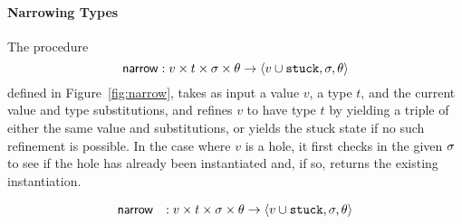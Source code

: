 \paragraph{Narrowing Types}
The procedure %
\[
\mathsf{narrow} : v \times t \times \sigma \times \theta \rightarrow \langle v \cup \mathtt{stuck}, \sigma, \theta \rangle
\]%
defined in Figure~\ref{fig:narrow}, takes as input a value $v$, a type
$t$, and the current value and type substitutions, and refines $v$ to
have type $t$ by yielding a triple of either the same value and
substitutions, or yields the stuck state if no such refinement is
possible. In the case where $v$ is a hole, it first checks in the given
$\sigma$ to see if the hole has already been instantiated and, if so,
returns the existing instantiation.
%
\begin{figure}[t]
\[
\begin{array}{lll}
\mathsf{narrow}                  & : v \times t \times \sigma \times \theta \rightarrow \langle v \cup \mathtt{stuck}, \sigma, \theta \rangle \\


\end{array}\]
\end{figure}
